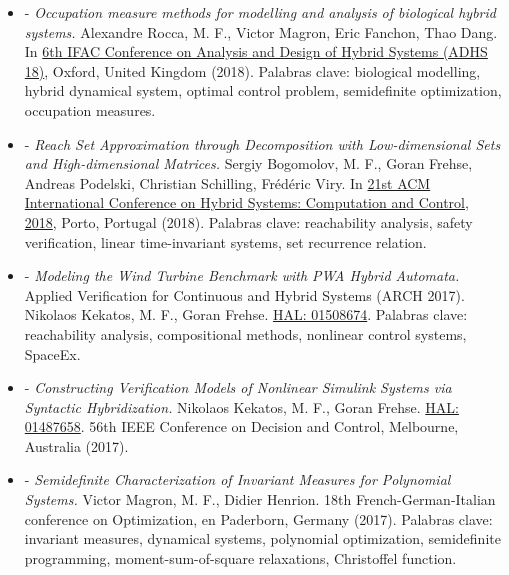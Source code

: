 \documentclass[10pt]{article}
\newenvironment{outerlist}[1][\enskip\textbullet]%
        {\begin{itemize}[#1]}{\end{itemize}%
         \vspace{-.6\baselineskip}}
\begin{document}
\begin{outerlist}
		\item[-] \emph{Occupation measure methods for modelling and analysis of biological hybrid systems.} Alexandre Rocca, M. F., Victor Magron, Eric Fanchon, Thao Dang.
		In \href{https://www.cs.ox.ac.uk/conferences/ADHS18/}{6th IFAC Conference on Analysis and Design of Hybrid Systems (ADHS 18)}, Oxford, United Kingdom (2018). Palabras clave: biological modelling, hybrid dynamical system, optimal control problem, semidefinite optimization, occupation measures.

		\item[-] \emph{Reach Set Approximation through Decomposition with Low-dimensional Sets and High-dimensional Matrices.} Sergiy Bogomolov, M. F., Goran Frehse, Andreas Podelski, Christian Schilling, Frédéric Viry.
		In \href{https://www.hscc2018.deib.polimi.it}{21st ACM International Conference on Hybrid Systems: Computation and Control, 2018}, Porto, Portugal (2018). Palabras clave: reachability analysis, safety verification, linear time-invariant systems, set recurrence relation.

		\item[-] \emph{Modeling the Wind Turbine Benchmark with PWA Hybrid Automata.} Applied Verification for Continuous and Hybrid Systems (ARCH 2017). Nikolaos Kekatos, M. F., Goran Frehse.  \href{https://hal.archives-ouvertes.fr/hal-01508674}{HAL: 01508674}. Palabras clave: reachability analysis, compositional methods, nonlinear control systems, SpaceEx. 

		\item[-] \emph{Constructing Verification Models of Nonlinear Simulink Systems via Syntactic Hybridization.} Nikolaos Kekatos, M. F., Goran Frehse.  \href{https://hal.archives-ouvertes.fr/hal-01487658}{HAL: 01487658}. 56th IEEE Conference on Decision and Control, Melbourne, Australia (2017).
		
		\item[-] \emph{Semidefinite Characterization of Invariant Measures for Polynomial Systems.} Victor Magron, M. F., Didier Henrion. 18th French-German-Italian conference on Optimization, en Paderborn, Germany (2017). Palabras clave: invariant measures, dynamical systems, polynomial optimization, semidefinite programming, moment-sum-of-square relaxations, Christoffel function. 

\end{outerlist}
\end{document}
